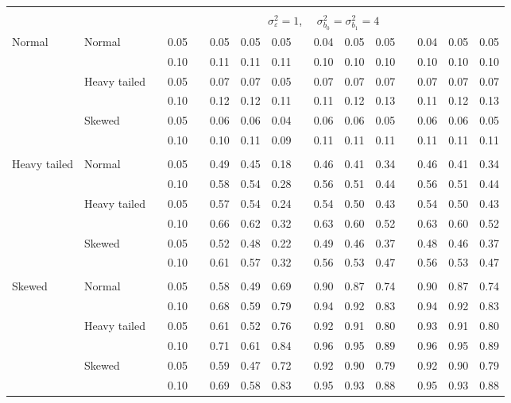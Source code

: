 \begin{table}[ht]
\begin{scriptsize}
\begin{tabular}{ll p{.1cm} c p{.1cm} rrr p{.1cm} rrr p{.1cm} rrr}
&&&&&&&&&&&&&&&\\
& && && \multicolumn{9}{c}{$\sigma_{\varepsilon}^2 = 1$, \ \ $\sigma_{b_0}^2 = \sigma_{b_1}^2 = 4$} \\ \cline{6-16}

\rowcolor{gray!20} Normal       & Normal       && 0.05 &&  0.05 & 0.05 & 0.05 && 0.04 & 0.05 & 0.05 && 0.04 & 0.05 & 0.05 \\ 
\rowcolor{gray!20}              &              && 0.10 &&  0.11 & 0.11 & 0.11 && 0.10 & 0.10 & 0.10 && 0.10 & 0.10 & 0.10 \\ 
\rowcolor{gray!20}              & Heavy tailed && 0.05 &&  0.07 & 0.07 & 0.05 && 0.07 & 0.07 & 0.07 && 0.07 & 0.07 & 0.07 \\ 
\rowcolor{gray!20}              &              && 0.10 &&  0.12 & 0.12 & 0.11 && 0.11 & 0.12 & 0.13 && 0.11 & 0.12 & 0.13 \\ 
\rowcolor{gray!20}              & Skewed       && 0.05 &&  0.06 & 0.06 & 0.04 && 0.06 & 0.06 & 0.05 && 0.06 & 0.06 & 0.05 \\ 
\rowcolor{gray!20}              &              && 0.10 &&  0.10 & 0.11 & 0.09 && 0.11 & 0.11 & 0.11 && 0.11 & 0.11 & 0.11 \\
              &&&&&&&&&&&&&&&\\
 Heavy tailed & Normal       && 0.05 &&  0.49 & 0.45 & 0.18 && 0.46 & 0.41 & 0.34 && 0.46 & 0.41 & 0.34 \\ 
              &              && 0.10 &&  0.58 & 0.54 & 0.28 && 0.56 & 0.51 & 0.44 && 0.56 & 0.51 & 0.44 \\ 
              & Heavy tailed && 0.05 &&  0.57 & 0.54 & 0.24 && 0.54 & 0.50 & 0.43 && 0.54 & 0.50 & 0.43 \\ 
              &              && 0.10 &&  0.66 & 0.62 & 0.32 && 0.63 & 0.60 & 0.52 && 0.63 & 0.60 & 0.52 \\ 
              & Skewed       && 0.05 &&  0.52 & 0.48 & 0.22 && 0.49 & 0.46 & 0.37 && 0.48 & 0.46 & 0.37 \\ 
              &              && 0.10 &&  0.61 & 0.57 & 0.32 && 0.56 & 0.53 & 0.47 && 0.56 & 0.53 & 0.47 \\ 
              &&&&&&&&&&&&&&&\\
 Skewed       & Normal       && 0.05 &&  0.58 & 0.49 & 0.69 && 0.90 & 0.87 & 0.74 && 0.90 & 0.87 & 0.74 \\ 
              &              && 0.10 &&  0.68 & 0.59 & 0.79 && 0.94 & 0.92 & 0.83 && 0.94 & 0.92 & 0.83 \\ 
              & Heavy tailed && 0.05 &&  0.61 & 0.52 & 0.76 && 0.92 & 0.91 & 0.80 && 0.93 & 0.91 & 0.80 \\ 
              &              && 0.10 &&  0.71 & 0.61 & 0.84 && 0.96 & 0.95 & 0.89 && 0.96 & 0.95 & 0.89 \\ 
              & Skewed       && 0.05 &&  0.59 & 0.47 & 0.72 && 0.92 & 0.90 & 0.79 && 0.92 & 0.90 & 0.79 \\ 
              &              && 0.10 &&  0.69 & 0.58 & 0.83 && 0.95 & 0.93 & 0.88 && 0.95 & 0.93 & 0.88 \\ 



\end{tabular}
\end{scriptsize}
\end{table}

